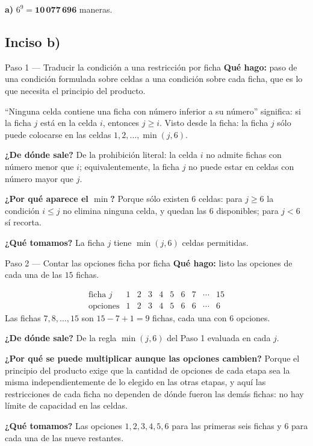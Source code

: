 \documentclass[11pt]{article}
\begin{document}
\begin{resp}
\textbf{a)} $6^{9} = \mathbf{10\,077\,696}$ maneras.
\end{resp}

\subsection*{Inciso b)}

\begin{paso}{Paso 1 --- Traducir la condición a una restricción por ficha}
\textbf{Qué hago:} paso de una condición formulada sobre celdas a una condición sobre cada ficha, que es lo que necesita el principio del producto.

``Ninguna celda contiene una ficha con número inferior a su número'' significa: si la ficha $j$ está en la celda $i$, entonces $j\ge i$. Visto desde la ficha: la ficha $j$ sólo puede colocarse en las celdas $1,2,\dots,\min(j,6)$.

\textbf{¿De dónde sale?} De la prohibición literal: la celda $i$ no admite fichas con número menor que $i$; equivalentemente, la ficha $j$ no puede estar en celdas con número mayor que $j$.

\textbf{¿Por qué aparece el $\min$?} Porque sólo existen $6$ celdas: para $j\ge 6$ la condición $i\le j$ no elimina ninguna celda, y quedan las $6$ disponibles; para $j<6$ sí recorta.

\textbf{¿Qué tomamos?} La ficha $j$ tiene $\min(j,6)$ celdas permitidas.
\end{paso}

\begin{paso}{Paso 2 --- Contar las opciones ficha por ficha}
\textbf{Qué hago:} listo las opciones de cada una de las $15$ fichas.

\[
\begin{array}{c|ccccccccc}
\text{ficha } j & 1 & 2 & 3 & 4 & 5 & 6 & 7 & \cdots & 15\\ \hline
\text{opciones} & 1 & 2 & 3 & 4 & 5 & 6 & 6 & \cdots & 6
\end{array}
\]
Las fichas $7,8,\dots,15$ son $15-7+1 = 9$ fichas, cada una con $6$ opciones.

\textbf{¿De dónde sale?} De la regla $\min(j,6)$ del Paso 1 evaluada en cada $j$.

\textbf{¿Por qué se puede multiplicar aunque las opciones cambien?} Porque el principio del producto exige que la cantidad de opciones de cada etapa sea la misma independientemente de lo elegido en las otras etapas, y aquí las restricciones de cada ficha no dependen de dónde fueron las demás fichas: no hay límite de capacidad en las celdas.

\textbf{¿Qué tomamos?} Las opciones $1,2,3,4,5,6$ para las primeras seis fichas y $6$ para cada una de las nueve restantes.
\end{paso}
\end{document}
